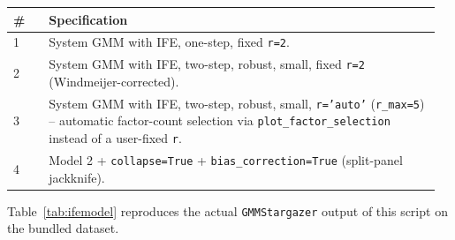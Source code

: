 \documentclass[11pt,a4paper]{article}
\begin{document}
\begin{longtable}{@{}p{0.08\linewidth}p{0.88\linewidth}@{}}
\toprule
\textbf{\#} & \textbf{Specification} \\
\midrule
\endhead
1 & System GMM with IFE, one-step, fixed \texttt{r=2}. \\
2 & System GMM with IFE, two-step, robust, small, fixed \texttt{r=2}
  (Windmeijer-corrected). \\
3 & System GMM with IFE, two-step, robust, small, \texttt{r='auto'}
  (\texttt{r\_max=5}) -- automatic factor-count selection via
  \texttt{plot\_factor\_selection} instead of a user-fixed \texttt{r}. \\
4 & Model 2 + \texttt{collapse=True} + \texttt{bias\_correction=True}
  (split-panel jackknife). \\
\bottomrule
\end{longtable}

Table~\ref{tab:ifemodel} reproduces the actual \texttt{GMMStargazer} output
of this script on the bundled dataset.
\end{document}
